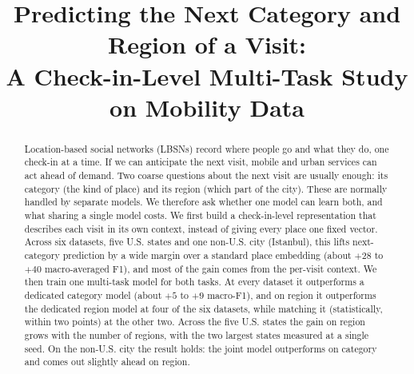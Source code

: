 \documentclass[conference]{IEEEtran}
\begin{document}
\title{Predicting the Next Category and Region of a Visit:\\
A Check-in-Level Multi-Task Study on Mobility Data}

\author{
}

\maketitle

\begin{abstract}
Location-based social networks (LBSNs) record where people go and what they
do, one check-in at a time. If we can anticipate the next visit, mobile and
urban services can act ahead of demand. Two coarse questions about the next
visit are usually enough: its category (the kind of place) and its region (which
part of the city). These are normally handled by separate models. We therefore ask whether one
model can learn both, and what sharing a single model costs. We first
build a check-in-level representation that describes each visit in its own
context, instead of giving every place one fixed vector. Across six datasets,
five U.S. states and one non-U.S. city (Istanbul), this lifts next-category
prediction by a wide margin over a standard
place embedding (about $+28$ to $+40$ macro-averaged F1),
and most of the gain comes from the per-visit context. We then train one
multi-task model for both tasks. At every dataset it outperforms a dedicated
category model (about $+5$ to $+9$ macro-F1), and on region it outperforms the dedicated region model
at four of the six datasets, while matching it (statistically, within two points)
at the other two. Across the five U.S. states the gain on region grows with the
number of regions, with the two largest states measured at a single seed. On the
non-U.S. city the result holds: the joint model outperforms on
category and comes out slightly ahead on region.
\end{abstract}
\end{document}
